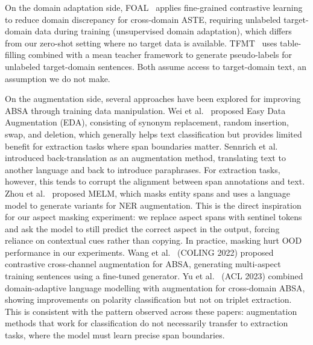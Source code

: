 \documentclass[12pt,a4paper]{report}
\begin{document}
On the domain adaptation side, FOAL~\cite{foal2023} applies fine-grained contrastive learning to reduce domain discrepancy for cross-domain ASTE, requiring unlabeled target-domain data during training (unsupervised domain adaptation), which differs from our zero-shot setting where no target data is available. TFMT~\cite{tfmt2024} uses table-filling combined with a mean teacher framework to generate pseudo-labels for unlabeled target-domain sentences. Both assume access to target-domain text, an assumption we do not make.

On the augmentation side, several approaches have been explored for improving ABSA through training data manipulation. Wei et al.~\cite{wei2019eda} proposed Easy Data Augmentation (EDA), consisting of synonym replacement, random insertion, swap, and deletion, which generally helps text classification but provides limited benefit for extraction tasks where span boundaries matter. Sennrich et al.~\cite{sennrich2016backtranslation} introduced back-translation as an augmentation method, translating text to another language and back to introduce paraphrases. For extraction tasks, however, this tends to corrupt the alignment between span annotations and text. Zhou et al.~\cite{zhou2021melm} proposed MELM, which masks entity spans and uses a language model to generate variants for NER augmentation. This is the direct inspiration for our aspect masking experiment: we replace aspect spans with sentinel tokens and ask the model to still predict the correct aspect in the output, forcing reliance on contextual cues rather than copying. In practice, masking hurt OOD performance in our experiments. Wang et al.~\cite{wang2022contrastive_aug} (COLING 2022) proposed contrastive cross-channel augmentation for ABSA, generating multi-aspect training sentences using a fine-tuned generator. Yu et al.~\cite{yu2023crossdomain_aug} (ACL 2023) combined domain-adaptive language modelling with augmentation for cross-domain ABSA, showing improvements on polarity classification but not on triplet extraction. This is consistent with the pattern observed across these papers: augmentation methods that work for classification do not necessarily transfer to extraction tasks, where the model must learn precise span boundaries.
\end{document}
